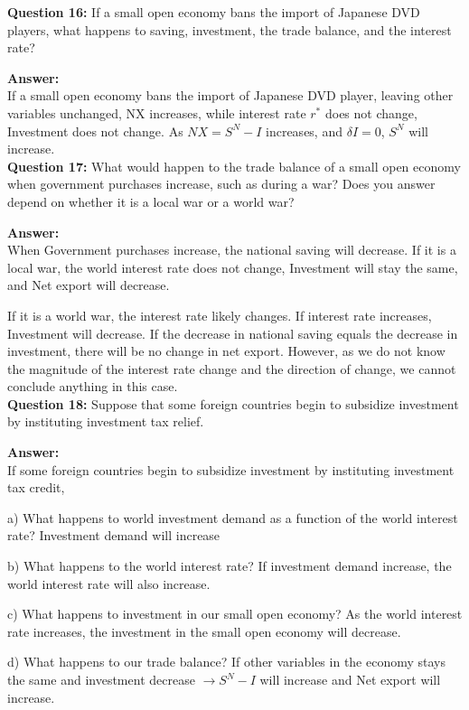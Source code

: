 \documentclass[a4paper, 11pt]{article}
\begin{document}
\textbf{Question 16:} If a small open economy bans the import of Japanese DVD players, what happens to saving, investment, the trade balance, and the interest rate?

\textbf{Answer:} \\
If a small open economy bans the import of Japanese DVD player, leaving other variables unchanged, NX increases, while interest rate $r^{*}$ does not change, Investment does not change. As $NX = S^{N} - I$ increases, and $\delta I = 0$, $S^{N}$ will increase. \\

\textbf{Question 17:} What would happen to the trade balance of a small open economy when government purchases increase, such as during a war? Does you answer depend on whether it is a local war or a world war?

\textbf{Answer:} \\
When Government purchases increase, the national saving will decrease. If it is a local war, the world interest rate does not change, Investment will stay the same, and Net export will decrease.

If it is a world war, the interest rate likely changes. If interest rate increases, Investment will decrease. If the decrease in national saving equals the decrease in investment, there will be no change in net export. However, as we do not know the magnitude of the interest rate change and the direction of change, we cannot conclude anything in this case. \\

\textbf{Question 18:} Suppose that some foreign countries begin to subsidize investment by instituting investment tax relief.

\textbf{Answer:} \\
If some foreign countries begin to subsidize investment by instituting investment tax credit, 

a) What happens to world investment demand as a function of the world interest rate? Investment demand will increase

b) What happens to the world interest rate? If investment demand increase, the world interest rate will also increase.

c) What happens to investment in our small open economy? As the world interest rate increases, the investment in the small open economy will decrease.

d) What happens to our trade balance? If other variables in the economy stays the same and investment decrease $\rightarrow S^{N} - I$ will increase and Net export will increase. \\
\end{document}
